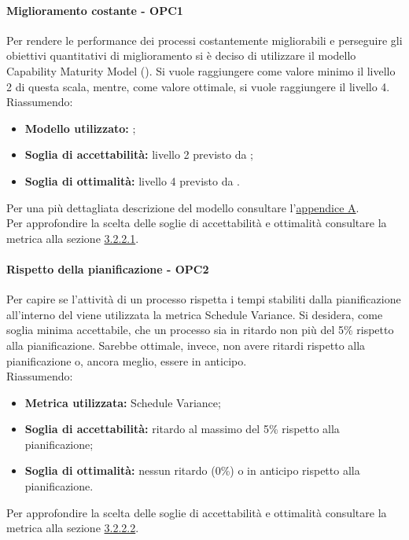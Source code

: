 \documentclass[PianoDiQualifica.tex]{subfiles}
\begin{document}
			\paragraph{Miglioramento costante - OPC1}
			Per rendere le performance dei processi costantemente migliorabili e perseguire gli obiettivi quantitativi di miglioramento si è deciso di utilizzare il modello Capability Maturity Model ().
			Si vuole raggiungere come valore minimo il livello 2 di questa scala, mentre, come valore ottimale, si vuole raggiungere il livello 4. \\
			Riassumendo:
			\begin{itemize}
			\item \textbf{Modello utilizzato:} ;
			\item \textbf{Soglia di accettabilità:} livello 2 previsto da ;
			\item \textbf{Soglia di ottimalità:} livello 4 previsto da .
			\end{itemize}
			Per una più dettagliata descrizione del modello  consultare l'\hyperlink{CMM_label}{appendice A}. \\
			Per approfondire la scelta delle soglie di accettabilità e ottimalità consultare la metrica alla sezione \hyperlink{CMM_m}{3.2.2.1}.

			\paragraph{Rispetto della pianificazione - OPC2}
			Per capire se l'attività di un processo rispetta i tempi stabiliti dalla pianificazione all'interno del \PPdocRR{} viene utilizzata la metrica Schedule Variance.
			Si desidera, come soglia minima accettabile, che un processo sia in ritardo non più del 5\% rispetto alla pianificazione. Sarebbe ottimale, invece, non avere ritardi
			rispetto alla pianificazione o, ancora meglio, essere in anticipo.\\
			Riassumendo:
			\begin{itemize}
			\item \textbf{Metrica utilizzata:} Schedule Variance;
			\item \textbf{Soglia di accettabilità:} ritardo al massimo del 5\% rispetto alla pianificazione;
			\item \textbf{Soglia di ottimalità:} nessun ritardo (0\%) o in anticipo rispetto alla pianificazione.
			\end{itemize}
			Per approfondire la scelta delle soglie di accettabilità e ottimalità consultare la metrica alla sezione \hyperlink{Schedule_m}{3.2.2.2}.
\end{document}
